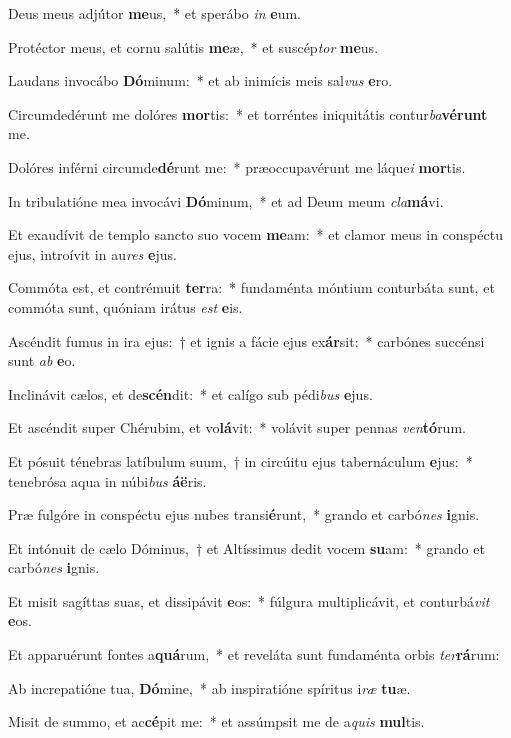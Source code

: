 \item Deus meus adjútor \textbf{me}us,~* et sperábo \textit{in} \textbf{e}um.
\item Protéctor meus, et cornu salútis \textbf{me}æ,~* et suscép\textit{tor} \textbf{me}us.
\item Laudans invocábo \textbf{Dó}minum:~* et ab inimícis meis sal\textit{vus} \textbf{e}ro.
\item Circumdedérunt me dolóres \textbf{mor}tis:~* et torréntes iniquitátis contur\textit{ba}\textbf{vé}\textbf{runt} me.
\item Dolóres inférni circumde\textbf{dé}runt me:~* præoccupavérunt me láque\textit{i} \textbf{mor}tis.
\item In tribulatióne mea invocávi \textbf{Dó}minum,~* et ad Deum meum \textit{cla}\textbf{má}vi.
\item Et exaudívit de templo sancto suo vocem \textbf{me}am:~* et clamor meus in conspéctu ejus, introívit in au\textit{res} \textbf{e}jus.
\item Commóta est, et contrémuit \textbf{ter}ra:~* fundaménta móntium conturbáta sunt, et commóta sunt, quóniam irátus \textit{est} \textbf{e}is.
\item Ascéndit fumus in ira ejus:~† et ignis a fácie ejus ex\textbf{ár}sit:~* carbónes succénsi sunt \textit{ab} \textbf{e}o.
\item Inclinávit cælos, et de\textbf{scén}dit:~* et calígo sub pédi\textit{bus} \textbf{e}jus.
\item Et ascéndit super Chérubim, et vo\textbf{lá}vit:~* volávit super pennas \textit{ven}\textbf{tó}rum.
\item Et pósuit ténebras latíbulum suum,~† in circúitu ejus tabernáculum \textbf{e}jus:~* tenebrósa aqua in núbi\textit{bus} \textbf{á}\textbf{ë}ris.
\item Præ fulgóre in conspéctu ejus nubes transi\textbf{é}runt,~* grando et carbó\textit{nes} \textbf{i}gnis.
\item Et intónuit de cælo Dóminus,~† et Altíssimus dedit vocem \textbf{su}am:~* grando et carbó\textit{nes} \textbf{i}gnis.
\item Et misit sagíttas suas, et dissipávit \textbf{e}os:~* fúlgura multiplicávit, et conturbá\textit{vit} \textbf{e}os.
\item Et apparuérunt fontes a\textbf{quá}rum,~* et reveláta sunt fundaménta orbis \textit{ter}\textbf{rá}rum:
\item Ab increpatióne tua, \textbf{Dó}mine,~* ab inspiratióne spíritus i\textit{ræ} \textbf{tu}æ.
\item Misit de summo, et ac\textbf{cé}pit me:~* et assúmpsit me de a\textit{quis} \textbf{mul}tis.
